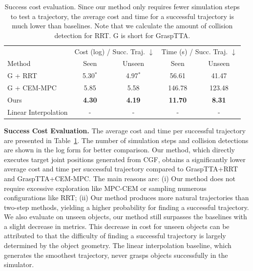 \documentclass[letterpaper, 10 pt, journal, twoside]{IEEEtran}
\newcommand{\tablestyle}[2]{\setlength{\tabcolsep}{#1}\renewcommand{\arraystretch}{#2}\centering\footnotesize}
\newcommand{\demph}[1]{\textcolor{demphcolor}{#1}}
\begin{document}
\begin{table}[t]
\tiny
\tablestyle{2pt}{1.05}
\centering
\begin{tabular}{l|cc|cc}
     & \multicolumn{2}{c}{Cost (log) / Succ. Traj. $\downarrow$} & \multicolumn{2}{c}{Time (s) / Succ. Traj. $\downarrow$} \\
     Method & Seen & Unseen & Seen & Unseen \\
    \shline
    G + RRT & 5.30$^*$ & 4.97$^*$ & 56.61 & 41.47 \\
    G + CEM-MPC & 5.85 & 5.58 & 146.78 & 123.48 \\
    Ours & \textbf{4.30} & \textbf{4.19} & \textbf{11.70} & \textbf{8.31} \\
    \hline
    \demph{Linear Interpolation} & \demph{-} & \demph{-} & \demph{-} & \demph{-} \\
\end{tabular}
\vspace{-0.05in}
\caption{\small
Success cost evaluation. Since our method only requires fewer simulation steps to test a trajectory, the average cost and time for a successful trajectory is much lower than baselines. Note that we calculate the amount of collision detection for RRT. G is short for GraspTTA.}
\label{tab:sim}
\vspace{-0.2in}
\end{table}






\textbf{Success Cost Evaluation.}
The average cost and time per successful trajectory are presented in Table~\ref{tab:sim}. The number of simulation steps and collision detections are shown in the log form for better comparison. Our method, which directly executes target joint positions generated from CGF, obtains a significantly lower average cost and time per successful trajectory compared to GraspTTA+RRT and GraspTTA+CEM-MPC.
The main reasons are: (i) Our method does not require excessive exploration like MPC-CEM or sampling numerous configurations like RRT; (ii) Our method produces more natural trajectories than two-step methods, yielding a higher probability for finding a successful trajectory.
We also evaluate on unseen objects, our method still surpasses the baselines with a slight decrease in metrics. This decrease in cost for unseen objects can be attributed to that the difficulty of finding a successful trajectory is largely determined by the object geometry. The linear interpolation baseline, which generates the smoothest trajectory, never grasps objects successfully in the simulator.
\end{document}
